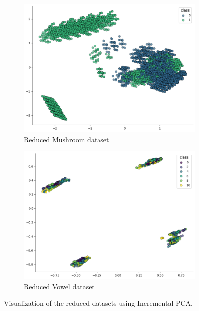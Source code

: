 \begin{figure}[h!]
    \centering
    \begin{subfigure}[b]{0.45\textwidth}
        \centering
        \includegraphics[width=\textwidth]{figures/mushroom_incremental_pca.png}
        \caption{Reduced Mushroom dataset}
        \label{Img5}
    \end{subfigure}
    \hfill
    \begin{subfigure}[b]{0.45\textwidth}
        \centering
        \includegraphics[width=\textwidth]{figures/vowel_incremental_pca.png}
        \caption{Reduced Vowel dataset}
        \label{Img6}
    \end{subfigure}
    
    \caption{Visualization of the reduced datasets using Incremental PCA.}
    \label{Img5_6}
\end{figure}

